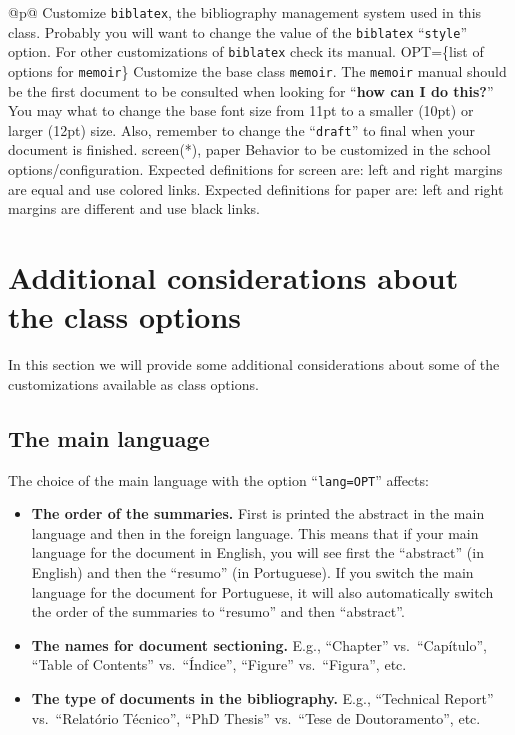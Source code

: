 \begin{ctabular}{@{}p{\linewidth}@{}}
    {Customize \texttt{biblatex}, the bibliography management system used in this class. Probably you will want to change the value of the \texttt{biblatex} “\texttt{style}” option. For other customizations of \texttt{biblatex} check its manual.}
    \midrule
    {OPT=\{list of options for \texttt{memoir}\}}%
    {Customize the base class \texttt{memoir}. The \texttt{memoir} manual should be the first document to be consulted when looking for “\textbf{how can I do this?}” You may what to change the base font size from 11pt to a smaller (10pt) or larger (12pt) size.  Also, remember to change the “\texttt{draft}” to final when your document is finished.}
    \midrule
    {screen(*), paper}%
    {Behavior to be customized in the school options/configuration. Expected definitions for screen are: left and right margins are equal and use colored links. Expected definitions for paper are: left and right margins are different and use black links.}
    \bottomrule
\end{ctabular}

\section{Additional considerations about the class options}
\label{sec:additional_considerations}

In this section we will provide some additional considerations about some of the customizations available as class options.

\subsection{The main language}
\label{sub:the_main_language}

The choice of the main language with the option “\texttt{lang=OPT}” affects:

\begin{itemize}
	\item \textbf{The order of the summaries.} First is printed the abstract in the main language and then in the foreign language. This means that if your main language for the document in English, you will see first the “abstract” (in English) and then the “resumo” (in Portuguese). If you switch the main language for the document for Portuguese, it will also automatically switch the order of the summaries to “resumo” and then “abstract”.
	\item \textbf{The names for document sectioning.} E.g., ``Chapter'' vs.\ ``Capítulo'', ``Table of Contents'' vs.\ ``Índice'', ``Figure'' vs.\ ``Figura'', etc.
	\item \textbf{The type of documents in the bibliography.} E.g., ``Technical Report'' vs.\ ``Relatório Técnico'', ``PhD Thesis'' vs.\ ``Tese de Doutoramento'', etc.
\end{itemize} 

